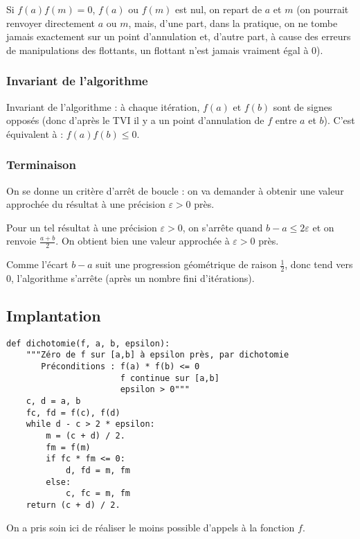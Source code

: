 \begin{rem}
  Si $f(a)f(m)=0$, $f(a)$ ou $f(m)$ est nul, on repart de $a$ et $m$ (on pourrait renvoyer directement $a$ ou $m$, 
mais, d'une part, dans la pratique, on ne tombe jamais exactement sur un point d'annulation et, d'autre 
part, à cause des erreurs de manipulations des flottants, un flottant n'est jamais vraiment égal à 0).
\end{rem}



\subsubsection*{Invariant de l'algorithme}

Invariant de l'algorithme : à chaque itération,  $f(a)$ et $f(b)$ sont de signes opposés (donc
d'après le TVI il y a un point d'annulation de $f$ entre $a$ et $b$). C'est équivalent à : $f(a)f(b)\leq 0$.



\subsubsection*{Terminaison}

On se donne un critère d'arrêt de boucle : on va demander à obtenir une valeur approchée du résultat à une précision $\varepsilon>0$ près. 

Pour un tel résultat à une précision $\varepsilon>0$, on
s'arrête quand $b - a \leq 2\varepsilon$ et on renvoie $\frac{a+b}{2}$.
On obtient bien une valeur approchée à $\varepsilon>0$ près. 

Comme l'écart $b-a$ suit une progression géométrique de raison
  $\frac{1}{2}$, donc tend vers $0$, l'algorithme s'arrête (après un nombre fini d'itérations).

\subsection{Implantation}
\begin{lstlisting}
def dichotomie(f, a, b, epsilon):
    """Zéro de f sur [a,b] à epsilon près, par dichotomie
       Préconditions : f(a) * f(b) <= 0
                       f continue sur [a,b]
                       epsilon > 0"""
    c, d = a, b
    fc, fd = f(c), f(d)
    while d - c > 2 * epsilon:
        m = (c + d) / 2.
        fm = f(m)
        if fc * fm <= 0:
            d, fd = m, fm
        else:
            c, fc = m, fm
    return (c + d) / 2.
\end{lstlisting}
\begin{rem}
  On a pris soin ici de réaliser le moins possible d'appels à la fonction $f$.
\end{rem}

